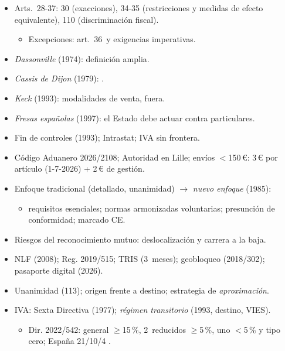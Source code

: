 \documentclass{article}
\begin{document}
\begin{columnas}
\begin{itemize}
\item Arts.~28-37: 30 (exacciones), 34-35 (restricciones y medidas de efecto equivalente), 110 (discriminación fiscal).
  \begin{itemize}
  \item Excepciones: art.~36~y exigencias imperativas.
  \end{itemize}
\item \emph{Dassonville} (1974): definición amplia.
\item \emph{Cassis de Dijon} (1979): .
\item \emph{Keck} (1993): modalidades de venta, fuera.
\item \emph{Fresas españolas} (1997): el Estado debe actuar contra particulares.
\end{itemize}
\begin{itemize}
\item Fin de controles (1993); Intrastat; IVA sin frontera.
\item Código Aduanero 2026/2108; Autoridad en Lille; envíos $<$150\,€: 3\,€ por artículo (1-7-2026) + 2\,€ de gestión.
\end{itemize}
\begin{itemize}
\item Enfoque tradicional (detallado, unanimidad) $\to$ \emph{nuevo enfoque} (1985):
  \begin{itemize}
  \item requisitos esenciales; normas armonizadas voluntarias; presunción de conformidad; marcado CE.
  \end{itemize}
\item Riesgos del reconocimiento mutuo: deslocalización y carrera a la baja.
\item NLF (2008); Reg. 2019/515; TRIS (3~meses); geobloqueo (2018/302); pasaporte digital (2026).
\end{itemize}
\begin{itemize}
\item Unanimidad (113); origen frente a destino; estrategia de \emph{aproximación}.
\item IVA: Sexta Directiva (1977); \emph{régimen transitorio} (1993, destino, VIES).
  \begin{itemize}
  \item Dir. 2022/542: general $\geq$15\,\%, 2~reducidos $\geq$5\,\%, uno $<$5\,\% y tipo cero; España 21/10/4 .

\end{itemize}
\end{itemize}
\end{columnas}
\end{document}
